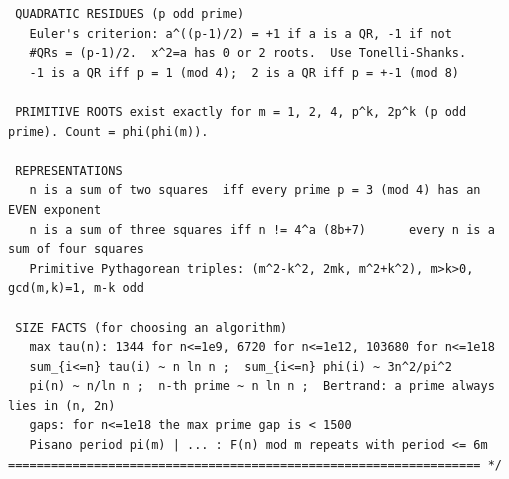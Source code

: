 \documentclass[9pt,a4paper,twocolumn]{extarticle}
\begin{document}
\begin{lstlisting}
 QUADRATIC RESIDUES (p odd prime)
   Euler's criterion: a^((p-1)/2) = +1 if a is a QR, -1 if not
   #QRs = (p-1)/2.  x^2=a has 0 or 2 roots.  Use Tonelli-Shanks.
   -1 is a QR iff p = 1 (mod 4);  2 is a QR iff p = +-1 (mod 8)

 PRIMITIVE ROOTS exist exactly for m = 1, 2, 4, p^k, 2p^k (p odd prime). Count = phi(phi(m)).

 REPRESENTATIONS
   n is a sum of two squares  iff every prime p = 3 (mod 4) has an EVEN exponent
   n is a sum of three squares iff n != 4^a (8b+7)      every n is a sum of four squares
   Primitive Pythagorean triples: (m^2-k^2, 2mk, m^2+k^2), m>k>0, gcd(m,k)=1, m-k odd

 SIZE FACTS (for choosing an algorithm)
   max tau(n): 1344 for n<=1e9, 6720 for n<=1e12, 103680 for n<=1e18
   sum_{i<=n} tau(i) ~ n ln n ;  sum_{i<=n} phi(i) ~ 3n^2/pi^2
   pi(n) ~ n/ln n ;  n-th prime ~ n ln n ;  Bertrand: a prime always lies in (n, 2n)
   gaps: for n<=1e18 the max prime gap is < 1500
   Pisano period pi(m) | ... : F(n) mod m repeats with period <= 6m
================================================================== */
\end{lstlisting}

\filbreak
\end{document}
